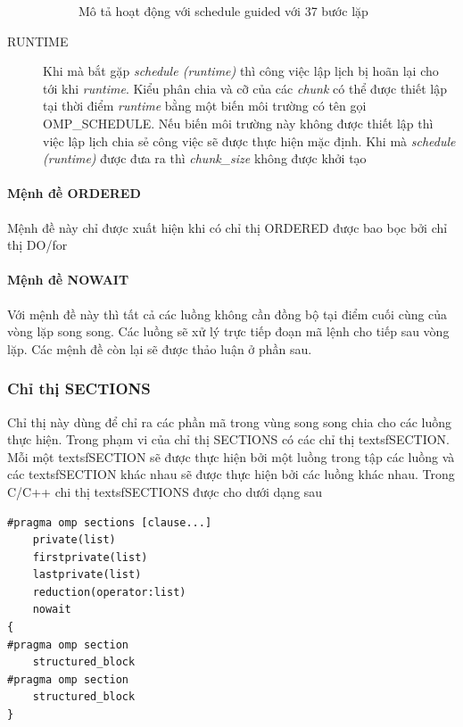 \documentclass{report}
\begin{document}
\begin{description}
\begin{figure}[htp]
		\caption{Mô tả hoạt động với schedule guided với 37 bước lặp}
	\end{figure}
	\item[RUNTIME]
	Khi mà bắt gặp \emph{schedule (runtime)} thì công việc lập lịch bị hoãn lại cho tới
	khi \emph{runtime}. Kiểu phân chia và cỡ của các \emph{chunk} có thể được thiết lập tại thời điểm \emph{runtime} bằng một biến môi trường có tên gọi \textsf{OMP\_SCHEDULE}. Nếu biến môi trường này không được thiết lập thì việc lập lịch chia sẻ công việc sẽ được thực hiện mặc định. Khi mà \emph{schedule (runtime)} được đưa ra thì \emph{chunk\_size} không được khởi tạo
	\end{description}

\paragraph{Mệnh đề ORDERED}
	Mệnh đề này chỉ được xuất hiện khi có chỉ thị ORDERED được bao bọc bởi chỉ thị \textsf{DO/for}
\paragraph{Mệnh đề NOWAIT}
Với mệnh đề này thì tất cả các luồng không cần đồng bộ tại điểm cuối cùng
của vòng lặp song song. Các luồng sẽ xử lý trực tiếp đoạn mã lệnh cho tiếp sau vòng
lặp. Các mệnh đề còn lại sẽ được thảo luận ở phần sau.

\subsubsection{Chỉ thị SECTIONS}
Chỉ thị này dùng để chỉ ra các phần mã trong vùng song song chia cho các
luồng thực hiện. Trong phạm vi của chỉ thị \textsf{SECTIONS} có các chỉ thị textsf{SECTION}. Mỗi
một textsf{SECTION} sẽ được thực hiện bởi một luồng trong tập các luồng và các textsf{SECTION}
khác nhau sẽ được thực hiện bởi các luồng khác nhau. Trong C/C++ chi thị
textsf{SECTIONS} được cho dưới dạng sau

\begin{verbatim}
#pragma omp sections [clause...]
	private(list)
	firstprivate(list)
	lastprivate(list)
	reduction(operator:list)
	nowait
{
#pragma omp section
	structured_block
#pragma omp section
	structured_block
}
\end{verbatim}
\end{document}
